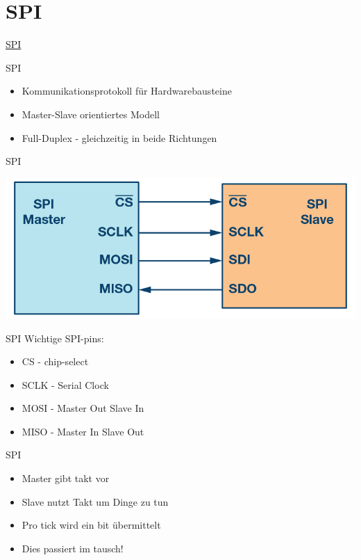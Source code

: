 \documentclass[aspectratio=169,presentation]{beamer}
\newcommand{\sectionframe}[1]{
	\begin{frame}
		\vfill
		\Huge
		\centering
		\usebeamercolor[fg]{title}
		#1
		\vfill
		\par
	\end{frame}
}
\begin{document}
\section{SPI}
\sectionframe{\href{https://users.informatik.haw-hamburg.de/~schafers/LOCAL/S17S_CE/DOCU/uC Reference Manual RM0090 DM00031020 DocID_018909_Rev14 2017-04.pdf}{SPI}}
\begin{frame} {SPI}
  \begin{itemize}
    \item Kommunikationsprotokoll für Hardwarebausteine
    \item Master-Slave orientiertes Modell
    \item Full-Duplex - gleichzeitig in beide Richtungen
  \end{itemize}
\end{frame}

\begin{frame} {SPI}
  \begin{center}
    \includegraphics[width=.8\textwidth]{SPI-single.png}
  \end{center}
\end{frame}

\begin{frame} {SPI}
  Wichtige SPI-pins:
  \begin{itemize}
    \item CS - chip-select
    \item SCLK - Serial Clock
    \item MOSI - Master Out Slave In
    \item MISO - Master In Slave Out
  \end{itemize}
\end{frame}

\begin{frame} {SPI}
  \begin{itemize}
    \item Master gibt takt vor
    \item Slave nutzt Takt um Dinge zu tun
    \item Pro tick wird ein bit übermittelt
    \item Dies passiert im tausch!
  \end{itemize}
\end{frame}
\end{document}
